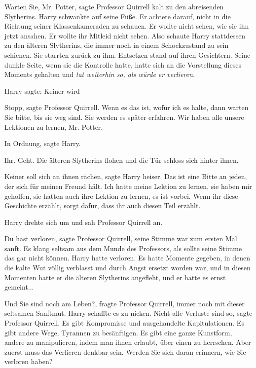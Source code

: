 \glqq Warten Sie, Mr. Potter\grqq{}, sagte Professor Quirrell kalt zu den
abreisenden Slytherins. Harry schwankte auf seine Füße. Er achtete darauf, nicht
in die Richtung seiner Klassenkameraden zu schauen. Er wollte nicht sehen, wie
sie ihn jetzt ansahen. Er wollte ihr Mitleid nicht sehen. Also schaute Harry
stattdessen zu den älteren Slytherins, die immer noch in einem Schockzustand zu
sein schienen. Sie starrten zurück zu ihm. Entsetzen stand auf ihren Gesichtern.
Seine dunkle Seite, wenn sie die Kontrolle hatte, hatte sich an die Vorstellung
dieses Moments gehalten und \emph{tat weiterhin so, als würde er verlieren.}

Harry sagte: \glqq Keiner wird -\grqq{}

\glqq Stopp\grqq{}, sagte Professor Quirrell. \glqq Wenn es das ist, wofür ich
es halte, dann warten Sie bitte, bis sie weg sind. Sie werden es später
erfahren. Wir haben alle unsere Lektionen zu lernen, Mr. Potter.\grqq{}

\glqq In Ordnung\grqq{}, sagte Harry.

\glqq Ihr. Geht.\grqq{} Die älteren Slytherins flohen und die Tür schloss sich
hinter ihnen.

\glqq Keiner soll sich an ihnen rächen\grqq{}, sagte Harry heiser. \glqq Das ist
eine Bitte an jeden, der sich für meinen Freund hält. Ich hatte meine Lektion zu
lernen, sie haben mir geholfen, sie hatten auch ihre Lektion zu lernen, es ist
vorbei. Wenn ihr diese Geschichte erzählt, sorgt dafür, dass ihr auch diesen
Teil erzählt.\grqq{}

Harry drehte sich um und sah Professor Quirrell an.

\glqq Du hast verloren\grqq{}, sagte Professor Quirrell, seine Stimme war zum
ersten Mal sanft. Es klang seltsam aus dem Munde des Professors, als sollte
seine Stimme das gar nicht können. Harry hatte verloren. Es hatte Momente
gegeben, in denen die kalte Wut völlig verblasst und durch Angst ersetzt worden
war, und in diesen Momenten hatte er die älteren Slytherins angefleht, und er
hatte es ernst gemeint...

\glqq Und Sie sind noch am Leben?\grqq{}, fragte Professor Quirrell, immer noch
mit dieser seltsamen Sanftmut. Harry schaffte es zu nicken. \glqq Nicht alle
Verluste sind so\grqq{}, sagte Professor Quirrell. \glqq Es gibt Kompromisse und
ausgehandelte Kapitulationen. Es gibt andere Wege, Tyrannen zu besänftigen. Es
gibt eine ganze Kunstform, andere zu manipulieren, indem man ihnen erlaubt, über
einen zu herrschen. Aber zuerst muss das Verlieren denkbar sein. Werden Sie sich
daran erinnern, wie Sie verloren haben?\grqq{}

